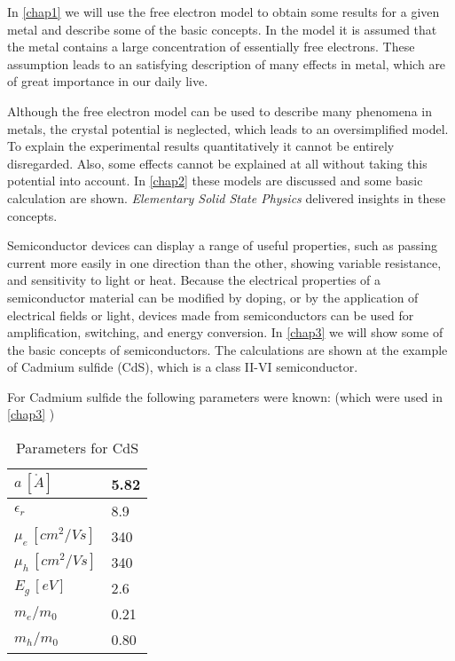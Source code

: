 In \ref{chap1}  we will use the free electron model to obtain some results for a given metal and describe some of the basic concepts. In the model it is assumed that the metal contains a large concentration of essentially free electrons. These assumption leads to an satisfying description of many effects in metal, which are of great importance in our daily live.

Although the free electron model can be used to describe many phenomena in metals, the crystal
potential is neglected, which leads to an oversimplified model. To explain the experimental results quantitatively it cannot be entirely disregarded. Also, some effects cannot be explained at all without taking this potential into account. In \ref{chap2}  these models are discussed and some basic calculation are shown. \textit{Elementary Solid State Physics} \cite{elementary_SSP} delivered insights in these concepts.

Semiconductor devices can display a range of useful properties, such as passing current more easily in one direction than the other, showing variable resistance, and sensitivity to light or heat. Because the electrical properties of a semiconductor material can be modified by doping, or by the application of electrical fields or light, devices made from semiconductors can be used for amplification, switching, and energy conversion. In \ref{chap3}  we will show some of the basic concepts of semiconductors. The calculations are shown at the example of Cadmium sulfide (CdS), which is a class II-VI semiconductor.  


For Cadmium sulfide the following parameters were known:
(which were used in \ref{chap3}  )

\begin{table}[h]
    \centering
    \begin{tabular}{l|l}
     $a \, [\mathring{A}]$      & 5.82 \\ \hline
     $\epsilon_r$               & 8.9  \\ \hline
     $\mu_e \, [cm^2/Vs]$       & 340  \\ \hline
     $\mu_h \, [cm^2/Vs]$       & 340  \\ \hline
     $E_g \, [eV]$              & 2.6  \\ \hline
     $m_e/m_0$                  & 0.21 \\ \hline
     $m_h/m_0$                  & 0.80 \\ 
    \end{tabular}
    \caption{Parameters for CdS}
\end{table}
